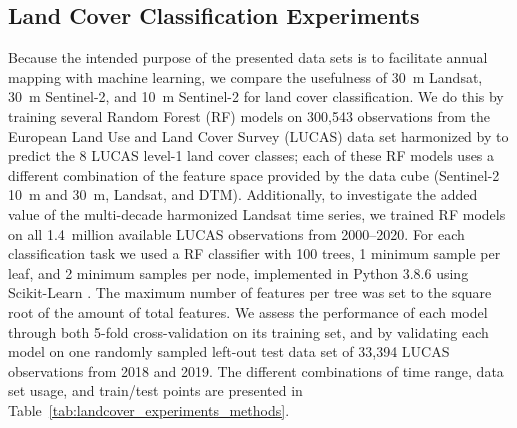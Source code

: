 \subsection*{Land Cover Classification Experiments}

Because the intended purpose of the presented data sets is to facilitate annual mapping with machine learning, we compare the usefulness of 30~m Landsat, 30~m Sentinel-2, and 10~m Sentinel-2 for land cover classification. We do this by training several Random Forest (RF) models on 300,543 observations from the European Land Use and Land Cover Survey (LUCAS) data set harmonized by \citet{d2020harmonised} to predict the 8 LUCAS level-1 land cover classes; each of these RF models uses a different combination of the feature space provided by the data cube (Sentinel-2 10~m and 30~m, Landsat, and DTM).  Additionally, to investigate the added value of the multi-decade harmonized Landsat time series, we trained RF models on all 1.4~million available LUCAS observations from 2000--2020. 
For each classification task we used a RF classifier with 100 trees, 1 minimum sample per leaf, and 2 minimum samples per node, implemented in Python 3.8.6  using Scikit-Learn . The maximum number of features per tree was set to the square root of the amount of total features. We assess the performance of each model through both 5-fold cross-validation on its training set, and by validating each model on one randomly sampled left-out test data set of 33,394 LUCAS observations from 2018 and 2019. The different combinations of time range, data set usage, and train/test points are presented in Table~\ref{tab:landcover_experiments_methods}. 

